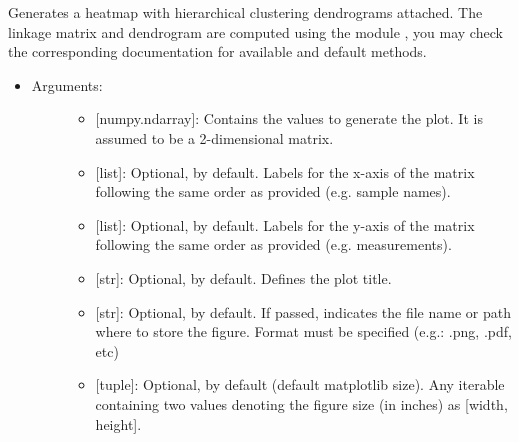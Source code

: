 \documentclass[letterpaper,10pt,english]{sphinxmanual}
\begin{document}
\begin{fulllineitems}
\label{\detokenize{plots:data_tools.plots.cluster_hmap}}
Generates a heatmap with hierarchical clustering dendrograms
attached. The linkage matrix and dendrogram are computed using the
module , you may check the
corresponding documentation for available and default methods.
\begin{itemize}
\item {} \begin{description}
\item[{Arguments:}] \leavevmode\begin{itemize}
\item {} 
 {[}numpy.ndarray{]}: Contains the values to generate the
plot. It is assumed to be a 2-dimensional matrix.

\item {} 
 {[}list{]}: Optional,  by default. Labels for
the x-axis of the matrix following the same order as provided
(e.g. sample names).

\item {} 
 {[}list{]}: Optional,  by default. Labels for
the y-axis of the matrix following the same order as provided
(e.g. measurements).

\item {} 
 {[}str{]}: Optional,  by default. Defines the plot
title.

\item {} 
 {[}str{]}: Optional,  by default. If passed,
indicates the file name or path where to store the figure.
Format must be specified (e.g.: .png, .pdf, etc)

\item {} 
 {[}tuple{]}: Optional,  by default (default
matplotlib size). Any iterable containing two values denoting
the figure size (in inches) as {[}width, height{]}.


\end{itemize}
\end{description}
\end{itemize}
\end{fulllineitems}
\end{document}
